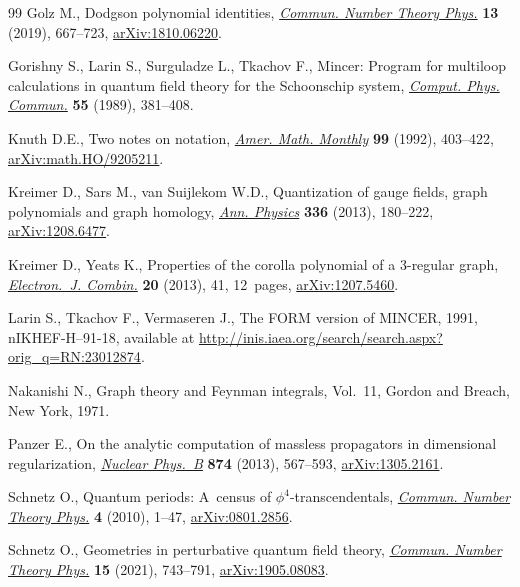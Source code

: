 \documentclass[pdftex]{sigma}
\numberwithin{equation}{section}
\begin{document}
\begin{thebibliography}{99}
Golz M., Dodgson polynomial identities, \href{https://doi.org/10.4310/CNTP.2019.v13.n4.a1}{\textit{Commun. Number Theory Phys.}}
 \textbf{13} (2019), 667--723, \href{https://arxiv.org/abs/1810.06220}{arXiv:1810.06220}.

Gorishny S., Larin S., Surguladze L., Tkachov F., Mincer: {P}rogram for
 multiloop calculations in quantum field theory for the {S}choonschip system,
 \href{https://doi.org/10.1016/0010-4655(89)90134-3}{\textit{Comput. Phys. Commun.}} \textbf{55} (1989), 381--408.

Knuth D.E., Two notes on notation, \href{https://doi.org/10.2307/2325085}{\textit{Amer. Math. Monthly}} \textbf{99}
 (1992), 403--422, \href{https://arxiv.org/abs/math.HO/9205211}{arXiv:math.HO/9205211}.

Kreimer D., Sars M., van Suijlekom W.D., Quantization of gauge fields, graph
 polynomials and graph homology, \href{https://doi.org/10.1016/j.aop.2013.04.019}{\textit{Ann. Physics}} \textbf{336} (2013),
 180--222, \href{https://arxiv.org/abs/1208.6477}{arXiv:1208.6477}.

Kreimer D., Yeats K., Properties of the corolla polynomial of a 3-regular
 graph, \href{https://doi.org/10.37236/2633}{\textit{Electron.~J. Combin.}} \textbf{20} (2013), 41, 12~pages,
 \href{https://arxiv.org/abs/1207.5460}{arXiv:1207.5460}.

Larin S., Tkachov F., Vermaseren J., The {FORM} version of {MINCER}, 1991,
 nIKHEF-H--91-18, available at
 \url{http://inis.iaea.org/search/search.aspx?orig_q=RN:23012874}.

Nakanishi N., Graph theory and {F}eynman integrals, Vol.~11, Gordon and Breach,
 New York, 1971.

Panzer E., On the analytic computation of massless propagators in dimensional
 regularization, \href{https://doi.org/10.1016/j.nuclphysb.2013.05.025}{\textit{Nuclear Phys.~B}} \textbf{874} (2013), 567--593,
 \href{https://arxiv.org/abs/1305.2161}{arXiv:1305.2161}.

Schnetz O., Quantum periods: {A}~census of {$\phi^4$}-transcendentals,
 \href{https://doi.org/10.4310/CNTP.2010.v4.n1.a1}{\textit{Commun. Number Theory Phys.}} \textbf{4} (2010), 1--47,
 \href{https://arxiv.org/abs/0801.2856}{arXiv:0801.2856}.

Schnetz O., Geometries in perturbative quantum field theory, \href{https://doi.org/10.4310/CNTP.2021.v15.n4.a2}{\textit{Commun.
 Number Theory Phys.}} \textbf{15} (2021), 743--791, \href{https://arxiv.org/abs/1905.08083}{arXiv:1905.08083}.


\end{thebibliography}
\end{document}
